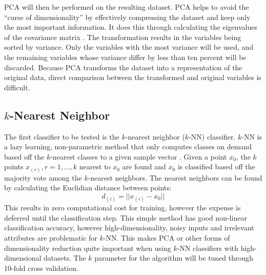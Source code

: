 \documentclass[twoside,11pt]{article}
\begin{document}
PCA will then be performed on the resulting dataset.  PCA helps to avoid the
``curse of dimensionality'' by effectively compressing the dataset and keep
only the most important information.  It does this through calculating the
eigenvalues of the covariance matrix \cite{Pearson:1901}.  The transformation
results in the variables being sorted by variance.  Only the variables with the
most variance will be used, and the remaining variables whose variance differ
by less than ten percent will be discarded.  Because PCA transforms the dataset
into a representation of the original data, direct comparison between the
transformed and original variables is difficult.

\subsection{$k$-Nearest Neighbor}
The first classifier to be tested is the $k$-nearest neighbor ($k$-NN)
classifier.  $k$-NN is a lazy learning, non-parametric method that only
computes classes on demand based off the $k$-nearest classes to a given sample
vector \cite{Cover:1967}.  Given a point $x_0$, the $k$ points $x_{(r)},
r=1,...,k$ nearest to $x_0$ are found and $x_0$ is classified based off the
majority vote among the $k$-nearest neighbors.  The nearest neighbors can be
found by calculating the Euclidian distance between points:
\begin{equation}
  d_{(i)} = ||x_{(i)} - x_0||
\end{equation}
This results in zero computational cost for training, however the expense is
deferred until the classification step.  This simple method has good non-linear
classification accuracy, however high-dimensionality, noisy inputs and
irrelevant attributes are problematic for $k$-NN.  This makes PCA or other
forms of dimensionality reduction quite important when using $k$-NN classifiers
with high-dimensional datasets.  The $k$ parameter for the algorithm will be
tuned through 10-fold cross validation.
\end{document}
